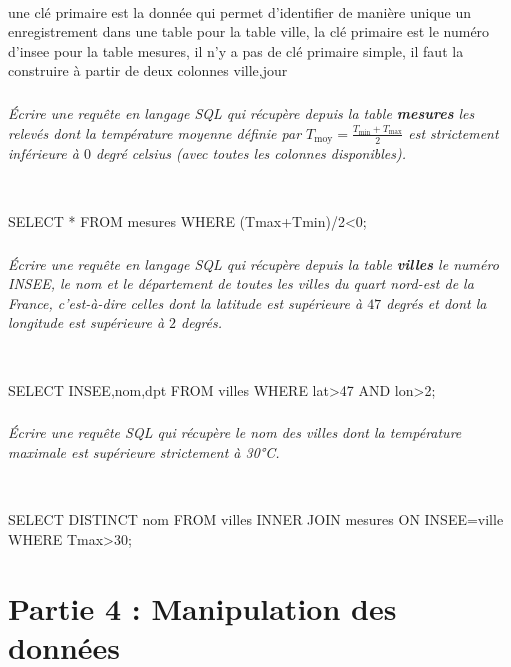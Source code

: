 \documentclass[10pt,fleqn]{article} %
\begin{document}
\ifprof
\begin{corrige}~\
\begin{python}
une clé primaire est la donnée qui permet d'identifier de manière unique un enregistrement dans une table
pour la table ville, la clé primaire est le numéro d'insee
pour la table mesures, il n'y a pas de clé primaire simple, il faut la construire à partir de deux colonnes ville,jour
\end{python}
\end{corrige}
\else
\fi
	
\subparagraph{} 	
\textit{ Écrire une requête en langage SQL qui récupère depuis la table 
	\textbf{mesures} les relevés dont la température moyenne définie par 
	$T_{\text{moy}}=\frac{T_{\text{min}}+T_{\text{max}}}{2}$ est strictement inférieure à $0$ degré celsius
		 (avec 	toutes les colonnes disponibles). }
		 
\ifprof
\begin{corrige}~\
\begin{python}
SELECT * FROM mesures WHERE (Tmax+Tmin)/2<0;
\end{python}
\end{corrige}
\else
\fi
	
\subparagraph{} 
\textit{Écrire une requête en langage SQL qui récupère depuis la table 
	\textbf{villes} le numéro INSEE, le nom et le département de toutes les villes du quart 
	nord-est de la France, c'est-à-dire celles dont la latitude est supérieure 
	à $47$ degrés et dont la longitude est supérieure à $2$ degrés.}

\ifprof
\begin{corrige}~\
\begin{python}
SELECT INSEE,nom,dpt  FROM villes WHERE lat>47 AND lon>2;
\end{python}
\end{corrige}
\else
\fi

\subparagraph{}
\textit{Écrire une requête SQL qui récupère le nom des villes dont la température maximale est supérieure strictement à 30°C.}

\ifprof
\begin{corrige}~\
\begin{python}
SELECT DISTINCT nom FROM villes INNER JOIN mesures ON INSEE=ville WHERE Tmax>30;
\end{python}
\end{corrige}
\else
\fi

\section*{Partie 4 : Manipulation des données}
\end{document}
